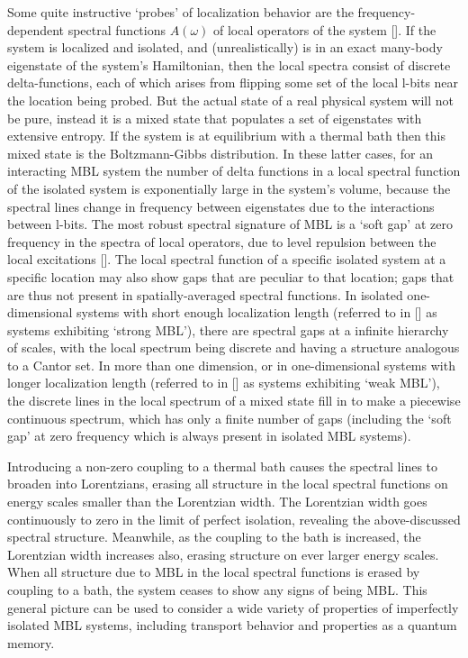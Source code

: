\documentclass[amsmath,onecolumn, superscriptaddress,preprint,aps]{revtex4}
\renewcommand{\cite}[1]{[\onlinecite{#1}]}
\begin{document}
Some quite instructive `probes' of localization behavior are the frequency-dependent spectral functions $A(\omega)$ of local operators of the system \cite{spectral}.
If the system is localized and isolated, and (unrealistically) is in an exact many-body eigenstate of the system's Hamiltonian, then the local spectra consist of
discrete delta-functions, each of which arises from flipping some set of the local l-bits near the location being probed.  But the actual state of a real physical
system will not be pure, instead it is a mixed state that populates a set of eigenstates with extensive entropy.  If the system is at equilibrium with a
thermal bath then this mixed state is the Boltzmann-Gibbs distribution.  In these latter cases, for an interacting MBL system the number of delta functions in a
local spectral function of the isolated system is exponentially large in the system's volume, because the spectral lines change in frequency between eigenstates due
to the interactions between l-bits.
The most robust spectral signature of MBL is a `soft gap' at zero frequency in the spectra of local operators, due to level repulsion between the local excitations \cite{spectral, spectralnumerics}.
The local spectral function of a specific isolated system at a specific location may also show gaps that are peculiar to that location; gaps that are thus not present in spatially-averaged spectral functions.
In isolated one-dimensional systems with short enough localization length (referred to in \cite{spectral} as systems exhibiting `strong MBL'), there are spectral gaps
at a infinite hierarchy of scales, with the local spectrum being discrete and having a structure analogous to a Cantor set.  In more than one dimension,
or in one-dimensional systems with longer localization length (referred to in \cite{spectral} as systems exhibiting `weak MBL'), the discrete lines in the local
spectrum of a mixed state fill in to make a piecewise continuous spectrum, which has only a finite number of gaps
(including the `soft gap' at zero frequency which is always present in isolated MBL systems).


Introducing a non-zero coupling to a thermal bath causes the spectral lines to broaden into Lorentzians, erasing all structure in the local spectral functions on
energy scales smaller than the Lorentzian width.  The Lorentzian width goes continuously to zero in the limit of perfect isolation, revealing the above-discussed
spectral structure.  Meanwhile, as the coupling to the bath is increased, the Lorentzian width increases also, erasing structure on ever larger energy scales.
When all structure due to MBL in the local spectral functions is erased by coupling to a bath, the system ceases to show any signs of being MBL. This general picture can be used to consider a wide variety of properties of imperfectly isolated MBL systems, including transport behavior and properties as
a quantum memory.
\end{document}
